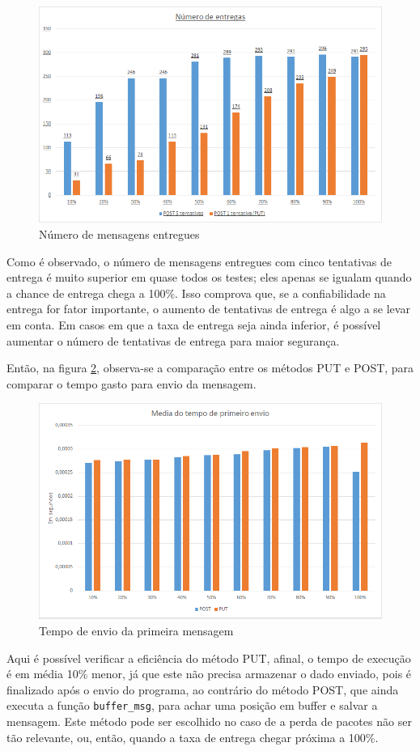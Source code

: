 \begin{figure}[!htb]
	\centering
	\includegraphics[width=.8\textwidth]{../imagens/Numero_entregas_PUTxPOST}
	\caption{Número de mensagens entregues}
	\label{fig:num_entregues_post5_post1}
\end{figure}

Como é observado, o número de mensagens entregues com cinco tentativas de entrega é muito superior em quase todos os testes; eles apenas se igualam quando a chance de entrega chega a 100\%. Isso comprova que, se a confiabilidade na entrega for fator importante, o aumento de tentativas de entrega é algo a se levar em conta. Em casos em que a taxa de entrega seja ainda inferior, é possível aumentar o número de tentativas de entrega para maior segurança.

Então, na figura \ref{fig:tempo_envio_1_msg_post5_put}, observa-se a comparação entre os métodos PUT e POST, para comparar o tempo gasto para envio da mensagem.

\begin{figure}[!htb]
	\centering
	\includegraphics[width=.8\textwidth]{../imagens/media_primeiro_envio_PUTxPOST}
	\caption{Tempo de envio  da primeira mensagem}
	\label{fig:tempo_envio_1_msg_post5_put}
\end{figure}

Aqui é possível verificar a eficiência do método PUT, afinal, o tempo de execução é em média 10\% menor, já que este não precisa armazenar o dado enviado, pois é finalizado após o envio do programa, ao contrário do método POST, que ainda executa a função \texttt{buffer\_msg}, para achar uma posição em buffer e salvar a mensagem. Este método pode ser escolhido no caso de a perda de pacotes não ser tão relevante, ou, então, quando a taxa de entrega chegar próxima a 100\%.



